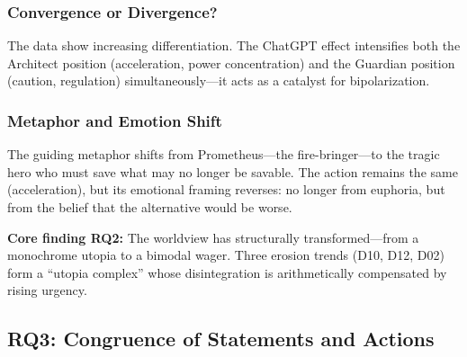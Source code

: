 \documentclass[12pt,a4paper]{article}
\begin{document}
\subsubsection{Convergence or Divergence?}

The data show increasing differentiation. The ChatGPT effect intensifies both the Architect position (acceleration, power concentration) and the Guardian position (caution, regulation) simultaneously---it acts as a catalyst for bipolarization.


\subsubsection{Metaphor and Emotion Shift}

The guiding metaphor shifts from Prometheus---the fire-bringer---to the tragic hero who must save what may no longer be savable. The action remains the same (acceleration), but its emotional framing reverses: no longer from euphoria, but from the belief that the alternative would be worse.

\medskip
\noindent\textbf{Core finding RQ2:} The worldview has structurally transformed---from a monochrome utopia to a bimodal wager. Three erosion trends (D10, D12, D02) form a ``utopia complex'' whose disintegration is arithmetically compensated by rising urgency.


\subsection{RQ3: Congruence of Statements and Actions}
\label{sec:ergebnisse:f3}
\end{document}
